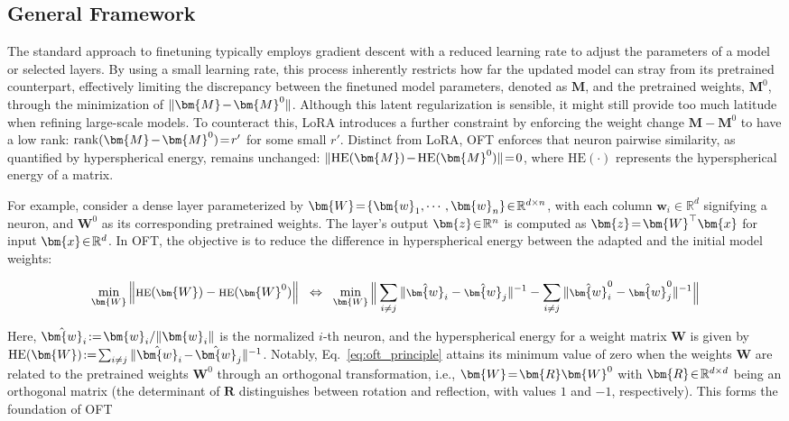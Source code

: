 \subsection{General Framework}

The standard approach to finetuning typically employs gradient descent with a reduced learning rate to adjust the parameters of a model or selected layers. By using a small learning rate, this process inherently restricts how far the updated model can stray from its pretrained counterpart, effectively limiting the discrepancy between the finetuned model parameters, denoted as $\bm{M}$, and the pretrained weights, $\bm{M}^0$, through the minimization of $\thickmuskip=2mu \medmuskip=2mu \| \bm{M} - \bm{M}^0\|$. Although this latent regularization is sensible, it might still provide too much latitude when refining large-scale models. To counteract this, LoRA introduces a further constraint by enforcing the weight change $\bm{M} - \bm{M}^0$ to have a low rank: $\thickmuskip=2mu \medmuskip=2mu \text{rank}(\bm{M} - \bm{M}^0)=r'$ for some small $r'$. Distinct from LoRA, OFT enforces that neuron pairwise similarity, as quantified by hyperspherical energy, remains unchanged: $\thickmuskip=2mu \medmuskip=2mu \| \text{HE}(\bm{M})-\text{HE}(\bm{M}^0) \|=0$, where $\text{HE}(\cdot)$ represents the hyperspherical energy of a matrix.

For example, consider a dense layer parameterized by $\thickmuskip=2mu \medmuskip=2mu \bm{W}=\{\bm{w}_1,\cdots,\bm{w}_n\}\in\mathbb{R}^{d\times n}$, with each column $\bm{w}_i\in\mathbb{R}^{d}$ signifying a neuron, and $\bm{W}^0$ as its corresponding pretrained weights. The layer’s output $\thickmuskip=2mu \medmuskip=2mu \bm{z}\in\mathbb{R}^n$ is computed as $\thickmuskip=2mu \medmuskip=2mu \bm{z}=\bm{W}^\top\bm{x}$ for input $\thickmuskip=2mu \medmuskip=2mu \bm{x}\in\mathbb{R}^d$. In OFT, the objective is to reduce the difference in hyperspherical energy between the adapted and the initial model weights:

\begin{equation}\label{eq:oft_principle}
\footnotesize
\min_{\bm{W}} \left\| \text{HE}(\bm{W})-\text{HE}(\bm{W}^0)\right\|~~\Leftrightarrow~~\min_{\bm{W}} \bigg{\|} \sum_{i\neq j} \|\hat{\bm{w}}_i-\hat{\bm{w}}_j\|^{-1}-\sum_{i\neq j} \|\hat{\bm{w}}^0_i-\hat{\bm{w}}^0_j\|^{-1}\bigg{\|}
\end{equation}

Here, $\thickmuskip=2mu \medmuskip=2mu \hat{\bm{w}}_i:=\bm{w}_i/\|\bm{w}_i\|$ is the normalized $i$-th neuron, and the hyperspherical energy for a weight matrix $\bm{W}$ is given by $\thickmuskip=2mu \medmuskip=2mu \text{HE}(\bm{W}):= \sum_{i\neq j} \|\hat{\bm{w}}_i-\hat{\bm{w}}_j\|^{-1}$. Notably, Eq.~\eqref{eq:oft_principle} attains its minimum value of zero when the weights $\bm{W}$ are related to the pretrained weights $\bm{W}^0$ through an orthogonal transformation, i.e., $\thickmuskip=2mu \medmuskip=2mu \bm{W}=\bm{R}\bm{W}^0$ with $\thickmuskip=2mu \medmuskip=2mu \bm{R}\in\mathbb{R}^{d\times d}$ being an orthogonal matrix (the determinant of $\bm{R}$ distinguishes between rotation and reflection, with values $1$ and $-1$, respectively). This forms the foundation of OFT

